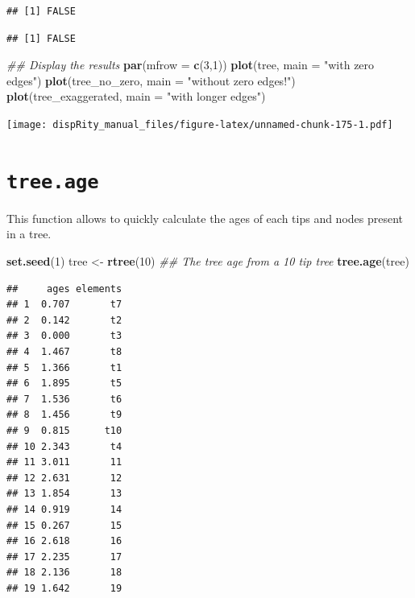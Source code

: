 \documentclass[
]{book}
\newenvironment{Shaded}{\begin{snugshade}}{\end{snugshade}}
\newcommand{\CommentTok}[1]{\textcolor[rgb]{0.56,0.35,0.01}{\textit{#1}}}
\newcommand{\DataTypeTok}[1]{\textcolor[rgb]{0.13,0.29,0.53}{#1}}
\newcommand{\DecValTok}[1]{\textcolor[rgb]{0.00,0.00,0.81}{#1}}
\newcommand{\KeywordTok}[1]{\textcolor[rgb]{0.13,0.29,0.53}{\textbf{#1}}}
\newcommand{\NormalTok}[1]{#1}
\newcommand{\OperatorTok}[1]{\textcolor[rgb]{0.81,0.36,0.00}{\textbf{#1}}}
\newcommand{\StringTok}[1]{\textcolor[rgb]{0.31,0.60,0.02}{#1}}
\begin{document}
\begin{verbatim}
## [1] FALSE
\end{verbatim}

\begin{Shaded}
\end{Shaded}

\begin{verbatim}
## [1] FALSE
\end{verbatim}

\begin{Shaded}
\begin{Highlighting}[]
\CommentTok{\#\# Display the results}
\KeywordTok{par}\NormalTok{(}\DataTypeTok{mfrow =} \KeywordTok{c}\NormalTok{(}\DecValTok{3}\NormalTok{,}\DecValTok{1}\NormalTok{))}
\KeywordTok{plot}\NormalTok{(tree, }\DataTypeTok{main =} \StringTok{"with zero edges"}\NormalTok{)}
\KeywordTok{plot}\NormalTok{(tree\_no\_zero, }\DataTypeTok{main =} \StringTok{"without zero edges!"}\NormalTok{)}
\KeywordTok{plot}\NormalTok{(tree\_exaggerated, }\DataTypeTok{main =} \StringTok{"with longer edges"}\NormalTok{)}
\end{Highlighting}
\end{Shaded}

\texttt{[image: dispRity\_manual\_files/figure-latex/unnamed-chunk-175-1.pdf]}

\hypertarget{tree.age}{%
\section{\texorpdfstring{\texttt{tree.age}}{tree.age}}\label{tree.age}}

This function allows to quickly calculate the ages of each tips and nodes present in a tree.

\begin{Shaded}
\begin{Highlighting}[]
\KeywordTok{set.seed}\NormalTok{(}\DecValTok{1}\NormalTok{)}
\NormalTok{tree \textless{}{-}}\StringTok{ }\KeywordTok{rtree}\NormalTok{(}\DecValTok{10}\NormalTok{)}
\CommentTok{\#\# The tree age from a 10 tip tree}
\KeywordTok{tree.age}\NormalTok{(tree)}
\end{Highlighting}
\end{Shaded}

\begin{verbatim}
##     ages elements
## 1  0.707       t7
## 2  0.142       t2
## 3  0.000       t3
## 4  1.467       t8
## 5  1.366       t1
## 6  1.895       t5
## 7  1.536       t6
## 8  1.456       t9
## 9  0.815      t10
## 10 2.343       t4
## 11 3.011       11
## 12 2.631       12
## 13 1.854       13
## 14 0.919       14
## 15 0.267       15
## 16 2.618       16
## 17 2.235       17
## 18 2.136       18
## 19 1.642       19
\end{verbatim}
\end{document}
